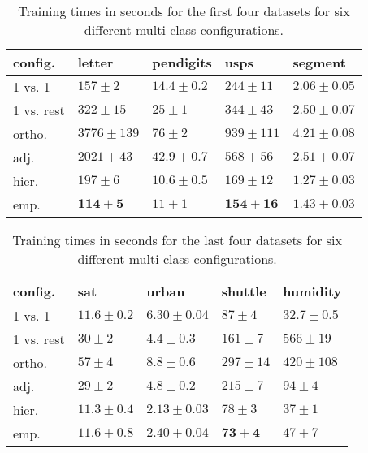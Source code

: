 \begin{table}
	\caption{Training times in seconds for the first four datasets for six different multi-class configurations.}\label{training1}
\begin{tabular}{|l|llll|}
\hline
config. & letter & pendigits & usps & segment \\
\hline\hline
1 vs. 1 & $157 \pm 2 $ & $14.4 \pm 0.2 $ & $244 \pm 11 $ & $2.06 \pm 0.05 $ \\
1 vs. rest & $322 \pm 15 $ & $25 \pm 1 $ & $344 \pm 43 $ & $2.50 \pm 0.07 $ \\
ortho. & $3776 \pm 139 $ & $76 \pm 2 $ & $939 \pm 111 $ & $4.21 \pm 0.08 $ \\
adj. & $2021 \pm 43 $ & $42.9 \pm 0.7 $ & $568 \pm 56 $ & $2.51 \pm 0.07 $ \\
	hier. & $197 \pm 6 $ & $\mathbf{10.6 \pm 0.5}$ & $169 \pm 12 $ & $\mathbf{1.27 \pm 0.03}$ \\
	emp. & $\mathbf{114 \pm 5} $ & $11 \pm 1 $ & $\mathbf{154 \pm 16} $ & $1.43 \pm 0.03 $ \\
\hline
\end{tabular}
\end{table}

\begin{table}
\caption{Training times in seconds for the last four datasets for six different multi-class configurations.}
\begin{tabular}{|l|llll|}
\hline
config. & sat & urban & shuttle & humidity\\
\hline\hline
	1 vs. 1 & $11.6 \pm 0.2 $ & $6.30 \pm 0.04 $ & $87 \pm 4 $ & $\mathbf{32.7 \pm 0.5}$ \\
1 vs. rest & $30 \pm 2 $ & $4.4 \pm 0.3 $ & $161 \pm 7 $ & $566 \pm 19 $ \\
ortho. & $57 \pm 4 $ & $8.8 \pm 0.6 $ & $297 \pm 14 $ & $420 \pm 108 $ \\
adj. & $29 \pm 2 $ & $4.8 \pm 0.2 $ & $215 \pm 7 $ & $94 \pm 4 $ \\
	hier. & $\mathbf{11.3 \pm 0.4}$& $\mathbf{2.13 \pm 0.03}$ & $78 \pm 3 $ & $37 \pm 1$ \\
	emp. & $11.6 \pm 0.8$ & $2.40 \pm 0.04 $ & $\mathbf{73 \pm 4}$ & $47 \pm 7 $ \\
\hline
\end{tabular}
\end{table}


